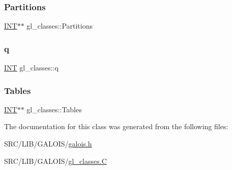 \subsubsection{\texorpdfstring{Partitions}{Partitions}}
{\footnotesize\ttfamily \mbox{\hyperlink{galois_8h_a09fddde158a3a20bd2dcadb609de11dc}{I\+NT}}$\ast$$\ast$ gl\+\_\+classes\+::\+Partitions}

\mbox{\label{classgl__classes_a9e7717abc4a20f926404ca28268d71a6}} 
\subsubsection{\texorpdfstring{q}{q}}
{\footnotesize\ttfamily \mbox{\hyperlink{galois_8h_a09fddde158a3a20bd2dcadb609de11dc}{I\+NT}} gl\+\_\+classes\+::q}

\mbox{\label{classgl__classes_a523ac61440134f7a69f9d57e5dcb565b}} 
\subsubsection{\texorpdfstring{Tables}{Tables}}
{\footnotesize\ttfamily \mbox{\hyperlink{galois_8h_a09fddde158a3a20bd2dcadb609de11dc}{I\+NT}}$\ast$$\ast$ gl\+\_\+classes\+::\+Tables}



The documentation for this class was generated from the following files\+:\begin{DoxyCompactItemize}
\item 
S\+R\+C/\+L\+I\+B/\+G\+A\+L\+O\+I\+S/\mbox{\hyperlink{galois_8h}{galois.\+h}}\item 
S\+R\+C/\+L\+I\+B/\+G\+A\+L\+O\+I\+S/\mbox{\hyperlink{gl__classes_8_c}{gl\+\_\+classes.\+C}}\end{DoxyCompactItemize}
